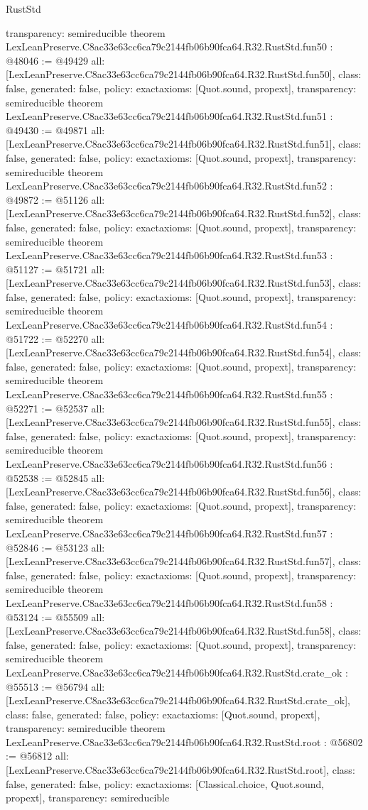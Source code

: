 \begin{lexlean}{RustStd}
\begin{coremodule}
{  transparency: semireducible
}
theorem LexLeanPreserve.C8ac33e63cc6ca79c2144fb06b90fca64.R32.RustStd.fun50 : @48046 := @49429 {
  all: [LexLeanPreserve.C8ac33e63cc6ca79c2144fb06b90fca64.R32.RustStd.fun50],
  class: false,
  generated: false,
  policy: exact{axioms: [Quot.sound, propext]},
  transparency: semireducible
}
theorem LexLeanPreserve.C8ac33e63cc6ca79c2144fb06b90fca64.R32.RustStd.fun51 : @49430 := @49871 {
  all: [LexLeanPreserve.C8ac33e63cc6ca79c2144fb06b90fca64.R32.RustStd.fun51],
  class: false,
  generated: false,
  policy: exact{axioms: [Quot.sound, propext]},
  transparency: semireducible
}
theorem LexLeanPreserve.C8ac33e63cc6ca79c2144fb06b90fca64.R32.RustStd.fun52 : @49872 := @51126 {
  all: [LexLeanPreserve.C8ac33e63cc6ca79c2144fb06b90fca64.R32.RustStd.fun52],
  class: false,
  generated: false,
  policy: exact{axioms: [Quot.sound, propext]},
  transparency: semireducible
}
theorem LexLeanPreserve.C8ac33e63cc6ca79c2144fb06b90fca64.R32.RustStd.fun53 : @51127 := @51721 {
  all: [LexLeanPreserve.C8ac33e63cc6ca79c2144fb06b90fca64.R32.RustStd.fun53],
  class: false,
  generated: false,
  policy: exact{axioms: [Quot.sound, propext]},
  transparency: semireducible
}
theorem LexLeanPreserve.C8ac33e63cc6ca79c2144fb06b90fca64.R32.RustStd.fun54 : @51722 := @52270 {
  all: [LexLeanPreserve.C8ac33e63cc6ca79c2144fb06b90fca64.R32.RustStd.fun54],
  class: false,
  generated: false,
  policy: exact{axioms: [Quot.sound, propext]},
  transparency: semireducible
}
theorem LexLeanPreserve.C8ac33e63cc6ca79c2144fb06b90fca64.R32.RustStd.fun55 : @52271 := @52537 {
  all: [LexLeanPreserve.C8ac33e63cc6ca79c2144fb06b90fca64.R32.RustStd.fun55],
  class: false,
  generated: false,
  policy: exact{axioms: [Quot.sound, propext]},
  transparency: semireducible
}
theorem LexLeanPreserve.C8ac33e63cc6ca79c2144fb06b90fca64.R32.RustStd.fun56 : @52538 := @52845 {
  all: [LexLeanPreserve.C8ac33e63cc6ca79c2144fb06b90fca64.R32.RustStd.fun56],
  class: false,
  generated: false,
  policy: exact{axioms: [Quot.sound, propext]},
  transparency: semireducible
}
theorem LexLeanPreserve.C8ac33e63cc6ca79c2144fb06b90fca64.R32.RustStd.fun57 : @52846 := @53123 {
  all: [LexLeanPreserve.C8ac33e63cc6ca79c2144fb06b90fca64.R32.RustStd.fun57],
  class: false,
  generated: false,
  policy: exact{axioms: [Quot.sound, propext]},
  transparency: semireducible
}
theorem LexLeanPreserve.C8ac33e63cc6ca79c2144fb06b90fca64.R32.RustStd.fun58 : @53124 := @55509 {
  all: [LexLeanPreserve.C8ac33e63cc6ca79c2144fb06b90fca64.R32.RustStd.fun58],
  class: false,
  generated: false,
  policy: exact{axioms: [Quot.sound, propext]},
  transparency: semireducible
}
theorem LexLeanPreserve.C8ac33e63cc6ca79c2144fb06b90fca64.R32.RustStd.crate_ok : @55513 := @56794 {
  all: [LexLeanPreserve.C8ac33e63cc6ca79c2144fb06b90fca64.R32.RustStd.crate_ok],
  class: false,
  generated: false,
  policy: exact{axioms: [Quot.sound, propext]},
  transparency: semireducible
}
theorem LexLeanPreserve.C8ac33e63cc6ca79c2144fb06b90fca64.R32.RustStd.root : @56802 := @56812 {
  all: [LexLeanPreserve.C8ac33e63cc6ca79c2144fb06b90fca64.R32.RustStd.root],
  class: false,
  generated: false,
  policy: exact{axioms: [Classical.choice, Quot.sound, propext]},
  transparency: semireducible
}


\end{coremodule}
\end{lexlean}
